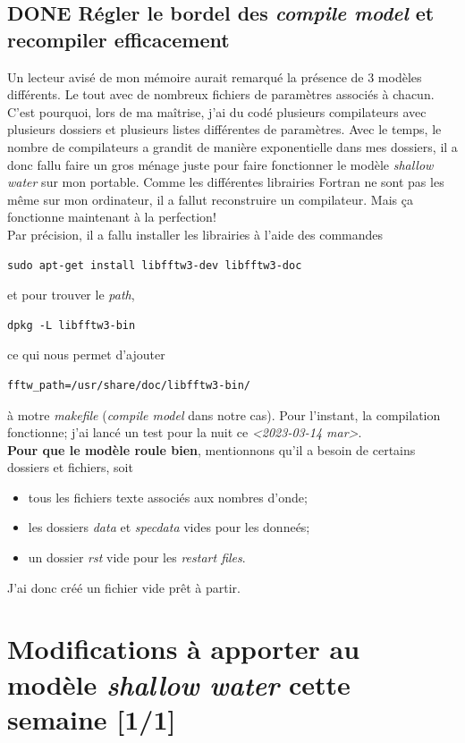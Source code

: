 \documentclass[10pt]{article}
\numberwithin{equation}{section}
\begin{document}
\subsection{{\bfseries\sffamily DONE} Régler le bordel des \emph{compile model} et recompiler efficacement}
\label{sec:org894b9ae}
Un lecteur avisé de mon mémoire aurait remarqué la présence de 3 modèles différents.
Le tout avec de nombreux fichiers de paramètres associés à chacun.
C'est pourquoi, lors de ma maîtrise, j'ai du codé plusieurs compilateurs avec plusieurs dossiers et plusieurs listes différentes de paramètres.
Avec le temps, le nombre de compilateurs a grandit de manière exponentielle dans mes dossiers, il a donc fallu faire un gros ménage juste pour faire  fonctionner le modèle \emph{shallow water} sur mon portable.
Comme  les différentes librairies Fortran ne sont pas les même sur mon ordinateur, il a fallut reconstruire un compilateur.
Mais ça fonctionne maintenant à la perfection!\\[0pt]


Par précision, il a fallu installer les librairies à l'aide des commandes
\begin{verbatim}
sudo apt-get install libfftw3-dev libfftw3-doc
\end{verbatim}
et pour trouver le \emph{path},
\begin{verbatim}
dpkg -L libfftw3-bin
\end{verbatim}
ce qui nous permet d'ajouter
\begin{verbatim}
fftw_path=/usr/share/doc/libfftw3-bin/
\end{verbatim}
à motre \emph{makefile} (\emph{compile model} dans notre cas). 
Pour l'instant, la compilation fonctionne; j'ai lancé un test pour la nuit ce \textit{<2023-03-14 mar>}.\\[0pt]

\textbf{Pour que le modèle roule bien}, mentionnons qu'il a besoin de certains dossiers et fichiers, soit 
\begin{itemize}
\item tous les fichiers texte associés aux nombres d'onde;
\item les dossiers \emph{data} et \emph{specdata} vides pour les donneés;
\item un dossier \emph{rst} vide pour les \emph{restart files}.
\end{itemize}
J'ai donc créé un fichier vide prêt à partir.





\section{Modifications à apporter au modèle \emph{shallow water} cette semaine [1/1]}
\label{sec:org5b0a1c0}
\end{document}
